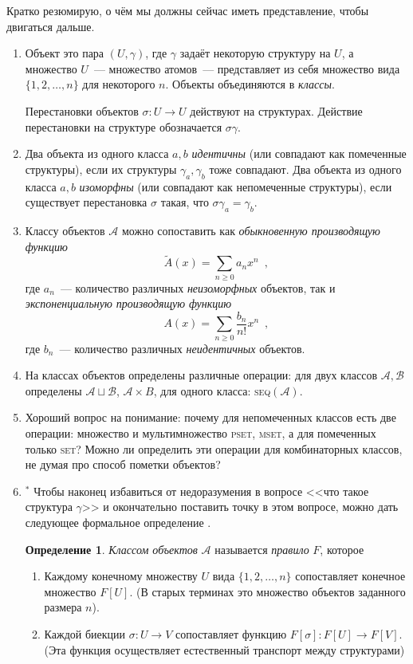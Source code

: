 \documentclass{article}
\theoremstyle{definition}
\newtheorem*{definition}{Определение}
\begin{document}
Кратко резюмирую, о чём мы должны сейчас иметь представление, чтобы двигаться 
дальше.
\begin{enumerate}
	\item Объект это пара \( (U, \gamma) \), где \( \gamma \) задаёт некоторую 
	структуру на \( U \), а множество \( U \)~--- множество атомов~--- 
	представляет из себя множество вида \( \{ 1,2,\ldots, n \} \) для 
	некоторого \( n \). Объекты объединяются в \textit{классы}.
	
	Перестановки объектов \( \sigma \colon U \to U \) действуют на структурах. 
	Действие перестановки на структуре обозначается \( \sigma \gamma \).
	\item Два объекта из одного класса \( a, b \) \textit{идентичны} (или 
	совпадают как помеченные структуры), если их структуры \( \gamma_a,	
	\gamma_b \) тоже совпадают. Два объекта из одного класса \( a, b \) 
	\textit{изоморфны} (или совпадают как непомеченные структуры), если 
	существует перестановка \( \sigma \) такая, что \( \sigma \gamma_a = 
	\gamma_b \).
	\item Классу объектов \( \mathcal A \) можно сопоставить как 
	\textit{обыкновенную производящую функцию}
	\[
		\widetilde A(x) = \sum_{n \geq 0} a_n x^n \enspace ,
	\]
	где \( a_n \)~--- количество различных \textit{неизоморфных} объектов, так 
	и \textit{экспоненциальную производящую функцию}
	\[
		A(x) = \sum_{n \geq 0} \dfrac{b_n}{n!} x^n \enspace ,
	\]
	где \( b_n \)~--- количество различных \textit{неидентичных} объектов.
	\item На классах объектов определены различные операции: для двух классов 
	\( \mathcal A, \mathcal B \) определены \( \mathcal A \sqcup \mathcal B \), 
	\( \mathcal A \times B \), для одного класса: \textsc{seq}\( 
	(\mathcal A) \).
	\item Хороший вопрос на понимание: почему для непомеченных классов есть две 
	операции: множество и мультимножество \textsc{pset}, \textsc{mset}, а для 
	помеченных только \textsc{set}? Можно ли определить эти операции для 
	комбинаторных классов, не думая про способ пометки объектов?
	\item\( ^{\ast} \) \footnotesize Чтобы наконец избавиться от недоразумения 
	в вопросе <<что такое структура \( \gamma \)>> и окончательно поставить 
	точку в этом вопросе, можно дать следующее формальное
	определение \cite[Definition 3, page 5]{species}. 
	\begin{definition}
	 	\textit{Классом объектов} \( \mathcal A \) называется \textit{правило} 
	 	\( F \), которое
	 	\begin{enumerate}
		 	\item Каждому конечному множеству \( U \) вида \( \{ 1, 2, \ldots, 
		 	n \} \) сопоставляет конечное множество \( F[U] \). (В старых 
		 	терминах это множество объектов заданного размера \( n \)).
		 	\item Каждой биекции \( \sigma \colon U \to V \) сопоставляет 
		 	функцию \( F[\sigma] \colon F[U] \to F[V] \). (Эта функция 
		 	осуществляет естественный транспорт между структурами)
		 	

\end{enumerate}
\end{definition}
\end{enumerate}
\end{document}
